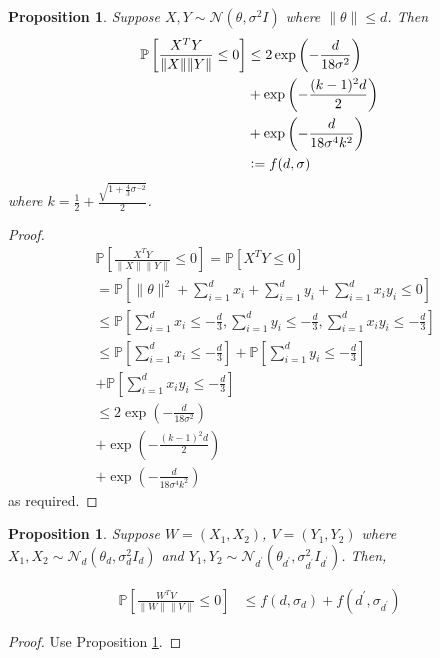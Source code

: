 \documentclass{article}
\theoremstyle{plain}
\newtheorem{proposition}[theorem]{Proposition}
\theoremstyle{definition}
\theoremstyle{remark}
\begin{document}
\begin{proposition}
    \label{prop:bound}
    Suppose \( X, Y \sim\mathcal{N}(\theta, \sigma^2I) \) where \( \|\theta\|\leq d \). Then
    \begin{align}
        \mathbb{P}\left[\frac{X^T Y}{\|X\|\|Y\|}\leq 0\right] &\leq 2\exp \left(-\frac{d}{18\sigma^2}\right) \\ &+ \exp\left(-\frac{(k-1)^2d}{2}\right) \\&+ \exp\left(-\frac{d}{18\sigma^4k^2}\right) \\ &\vcentcolon= f(d, \sigma)
    \end{align}
    where \(  k = \frac{1}{2} + \frac{\sqrt{1+\frac{4}{3}\sigma^{-2}}}{2} \).
\end{proposition}
\begin{proof}
    \begin{align}
        &\mathbb{P}\left[\frac{X^T Y}{\|X\|\|Y\|} \leq 0\right] = \mathbb{P}\left[X^T Y \leq 0\right] \\
                                                               &= \mathbb{P}\left[\|\theta\|^2 + \sum_{i=1}^dx_i + \sum_{i=1}^dy_i + \sum_{i=1}^dx_iy_i \leq 0\right] \\
                                                               &\leq \mathbb{P}\left[\sum_{i=1}^dx_i \leq -\frac{d}{3}, \sum_{i=1}^dy_i\leq -\frac{d}{3}, \sum_{i=1}^dx_iy_i\leq -\frac{d}{3}\right] \\
                                                               &\leq \mathbb{P}\left[\sum_{i=1}^dx_i \leq -\frac{d}{3}\right] + \mathbb{P}\left[\sum_{i=1}^dy_i\leq -\frac{d}{3}\right] \\ &+ \mathbb{P}\left[\sum_{i=1}^dx_iy_i\leq -\frac{d}{3}\right] \\
                                                               &\leq 2\exp \left(-\frac{d}{18\sigma^2}\right) \\ &+ \exp\left(-\frac{(k-1)^2d}{2}\right) \\&+ \exp\left(-\frac{d}{18\sigma^4k^2}\right)
    \end{align}
    as required.
\end{proof}

\begin{proposition}
    Suppose \( W = (X_1, X_2) \), \( V = (Y_1, Y_2) \) where \( X_1, X_2 \sim\mathcal{N}_d(\theta_d, \sigma^2_d I_d) \) and \( Y_1, Y_2\sim\mathcal{N}_{d^\prime}(\theta_{d^\prime}, \sigma^2_{d^\prime}I_{d^\prime}) \). Then,

    \begin{align}
        \mathbb{P}\left[\frac{W^T V}{\|W\|\|V\|}\leq 0\right] &\leq f(d, \sigma_d) + f(d^\prime, \sigma_{d^\prime})
    \end{align}
\end{proposition}
\begin{proof}
    Use Proposition \ref{prop:bound}.
\end{proof}
\end{document}
